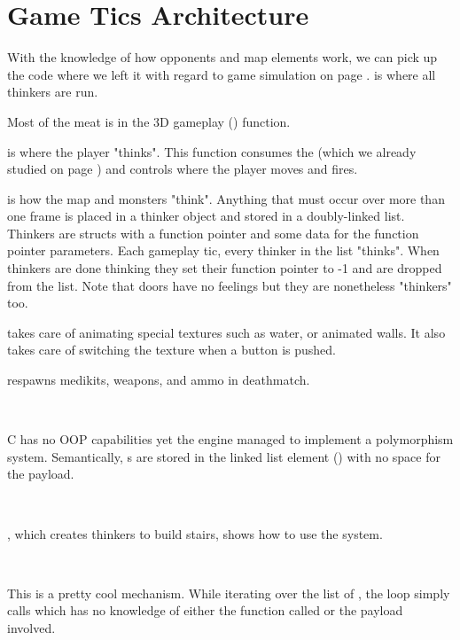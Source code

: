 \section{Game Tics Architecture}
With the knowledge of how opponents and map elements work, we can pick up the code where we left it with regard to game simulation on page \pageref{TryRunTics.c}.  is where all thinkers are run.\\
\par
{}
\par
Most of the meat is in the 3D gameplay () function.\\
\par
{}
\par
{} is where the player "thinks". This function consumes the  (which we already studied on page \pageref{cmd_t_type}) and controls where the player moves and fires.\\
\par 
{} is how the map and monsters "think". Anything that must occur over more than one frame is placed in a thinker object and stored in a doubly-linked list. Thinkers are structs with a function pointer and some data for the function pointer parameters. Each gameplay tic, every thinker in the list "thinks". When thinkers are done thinking they set their function pointer to -1 and are dropped from the list. Note that doors have no feelings but they are nonetheless "thinkers" too.\\
\par
{} takes care of animating special textures such as water, or animated walls. It also takes care of switching the texture when a button is pushed.\\
\par 

  respawns medikits, weapons, and ammo in deathmatch.



\\
\par
C has no OOP capabilities yet the engine managed to implement a polymorphism system. Semantically, s are stored in the linked list element () with no space for the payload. \\%
\par
{}\\
\par
{}, which creates thinkers to build stairs, shows how to use the system.\\
\par
{}\\
\par
This is a pretty cool mechanism. While iterating over the list of , the loop simply calls  which has no knowledge of either the function called or the payload involved.
